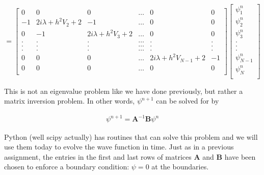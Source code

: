 \[=
\begin{bmatrix}
    0       & 0 & 0 & \dots & 0 & 0 \\
    -1       & 2 i \lambda + h^2V_2 + 2 & -1 & \dots & 0 & 0 \\
    0       & -1 & 2 i \lambda + h^2V_3 + 2 & \dots & 0 & 0 \\
    .       & . & . & \dots & . & . \\
    .       & . & . & \dots & . & . \\
    .       & . & . & \dots & . & . \\
    0       & 0 & 0 & \dots & 2 i \lambda + h^2V_{N-1} + 2 & -1 \\
    0       & 0 & 0 & \dots & 0 & 0 \\
\end{bmatrix}
\begin{bmatrix}
    \psi_1^n \\ 
    \psi_2^n \\ 
    \psi_3^n \\ 
      .\\
      .\\
      .\\
      \psi_{N-1}^n\\
      \psi_{N}^n\\
\end{bmatrix}
\]

This is not an eigenvalue problem like we have done previously, but
rather a matrix inversion problem. In other words, $\psi^{n+1}$ can be
solved for by

\begin{align}
\psi^{n+1} = \boldsymbol{A}^{-1} \boldsymbol{B} \psi^n
\end{align}

Python (well scipy actually) has routines that can solve this problem
and we will use them today to evolve the wave function in time. Just
as in a previous assignment, the entries in the first and last rows of
matrices $\boldsymbol{A}$ and $\boldsymbol{B}$ have been chosen to
enforce a boundary condition: $\psi=0$ at the boundaries.



